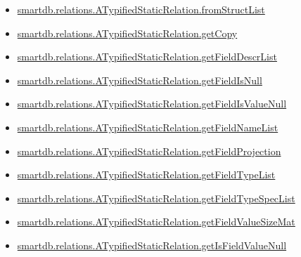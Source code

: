 \documentclass[letterpaper,10pt,english]{sphinxmanual}
\begin{document}
\begin{itemize}
\item {} 
{\hyperref[chap_functions:smartdb-relations-atypifiedstaticrelation-fromstructlist]{smartdb.relations.ATypifiedStaticRelation.fromStructList}}

\item {} 
{\hyperref[chap_functions:smartdb-relations-atypifiedstaticrelation-getcopy]{smartdb.relations.ATypifiedStaticRelation.getCopy}}

\item {} 
{\hyperref[chap_functions:smartdb-relations-atypifiedstaticrelation-getfielddescrlist]{smartdb.relations.ATypifiedStaticRelation.getFieldDescrList}}

\item {} 
{\hyperref[chap_functions:smartdb-relations-atypifiedstaticrelation-getfieldisnull]{smartdb.relations.ATypifiedStaticRelation.getFieldIsNull}}

\item {} 
{\hyperref[chap_functions:smartdb-relations-atypifiedstaticrelation-getfieldisvaluenull]{smartdb.relations.ATypifiedStaticRelation.getFieldIsValueNull}}

\item {} 
{\hyperref[chap_functions:smartdb-relations-atypifiedstaticrelation-getfieldnamelist]{smartdb.relations.ATypifiedStaticRelation.getFieldNameList}}

\item {} 
{\hyperref[chap_functions:smartdb-relations-atypifiedstaticrelation-getfieldprojection]{smartdb.relations.ATypifiedStaticRelation.getFieldProjection}}

\item {} 
{\hyperref[chap_functions:smartdb-relations-atypifiedstaticrelation-getfieldtypelist]{smartdb.relations.ATypifiedStaticRelation.getFieldTypeList}}

\item {} 
{\hyperref[chap_functions:smartdb-relations-atypifiedstaticrelation-getfieldtypespeclist]{smartdb.relations.ATypifiedStaticRelation.getFieldTypeSpecList}}

\item {} 
{\hyperref[chap_functions:smartdb-relations-atypifiedstaticrelation-getfieldvaluesizemat]{smartdb.relations.ATypifiedStaticRelation.getFieldValueSizeMat}}

\item {} 
{\hyperref[chap_functions:smartdb-relations-atypifiedstaticrelation-getisfieldvaluenull]{smartdb.relations.ATypifiedStaticRelation.getIsFieldValueNull}}


\end{itemize}
\end{document}
